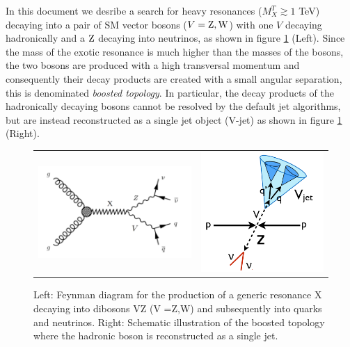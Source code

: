 In this document we desribe a search for heavy resonances ($M_{X}^{T} \gtrsim 1 $ TeV) decaying into a pair of SM vector
bosons ($V = \mathrm{Z}, \mathrm{W} $) with one $V$ decaying hadronically
and a $\mathrm{Z}$ decaying into neutrinos, as shown in figure \ref{fig:diagram} (Left). Since the mass of the
exotic resonance is much higher than the masses of the bosons,
the two bosons are produced with a high transversal momentum and
consequently their decay products are created with a small angular
separation, this is denominated \emph{boosted topology}.
In particular, the decay products of the hadronically decaying bosons cannot be resolved by the default jet algorithms, but are instead reconstructed as a single jet object (V-jet) as shown in figure \ref{fig:diagram} (Right). 

\begin{figure}[t!hb]
\caption{Left: Feynman diagram for the production of a generic resonance X
 decaying into dibosons VZ (V =Z,W) and subsequently into quarks and neutrinos. Right: Schematic illustration of the boosted topology where the hadronic boson is reconstructed as a single jet.}
\begin{tabular}{cc}
\includegraphics[width=250pt]{figures/feyn_inv.pdf} &
\includegraphics[width=200pt]{figures/boostjet.png}
\end{tabular}
\label{fig:diagram}
\end{figure}

